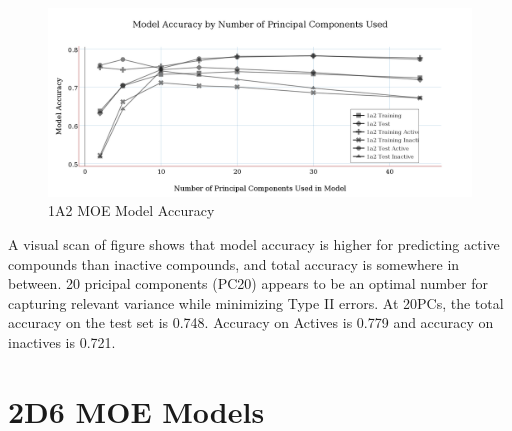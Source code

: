 \begin{figure}[!h]
\includegraphics[width=1\textwidth]{../img/1a2_moe_model_accuracy.png}
\caption{1A2 MOE Model Accuracy}
\end{figure}

A visual scan of figure shows that model accuracy is higher for predicting active compounds than inactive compounds, and total accuracy is somewhere in between. 20 pricipal components (PC20) appears to be an optimal number for capturing relevant variance while minimizing Type II errors. At 20PCs, the total accuracy on the test set is 0.748. Accuracy on Actives is 0.779 and accuracy on inactives is 0.721.

\section{2D6 MOE Models}

